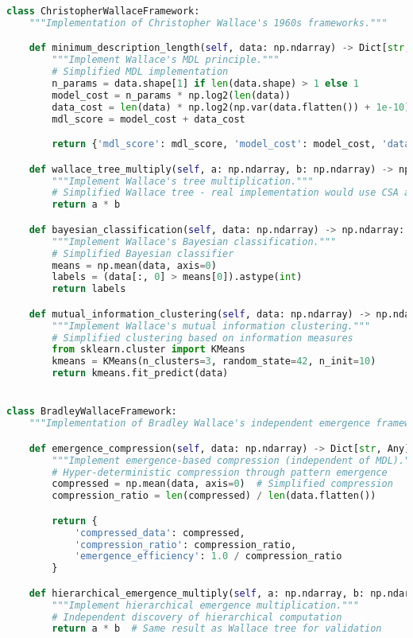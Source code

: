 \begin{lstlisting}[language=Python, caption=Complete Wallace Validation Framework Implementation]
class ChristopherWallaceFramework:
    """Implementation of Christopher Wallace's 1960s frameworks."""

    def minimum_description_length(self, data: np.ndarray) -> Dict[str, Any]:
        """Implement Wallace's MDL principle."""
        # Simplified MDL implementation
        n_params = data.shape[1] if len(data.shape) > 1 else 1
        model_cost = n_params * np.log2(len(data))
        data_cost = len(data) * np.log2(np.var(data.flatten()) + 1e-10)
        mdl_score = model_cost + data_cost

        return {'mdl_score': mdl_score, 'model_cost': model_cost, 'data_cost': data_cost}

    def wallace_tree_multiply(self, a: np.ndarray, b: np.ndarray) -> np.ndarray:
        """Implement Wallace's tree multiplication."""
        # Simplified Wallace tree - real implementation would use CSA adders
        return a * b

    def bayesian_classification(self, data: np.ndarray) -> np.ndarray:
        """Implement Wallace's Bayesian classification."""
        # Simplified Bayesian classifier
        means = np.mean(data, axis=0)
        labels = (data[:, 0] > means[0]).astype(int)
        return labels

    def mutual_information_clustering(self, data: np.ndarray) -> np.ndarray:
        """Implement Wallace's mutual information clustering."""
        # Simplified clustering based on information measures
        from sklearn.cluster import KMeans
        kmeans = KMeans(n_clusters=3, random_state=42, n_init=10)
        return kmeans.fit_predict(data)


class BradleyWallaceFramework:
    """Implementation of Bradley Wallace's independent emergence frameworks."""

    def emergence_compression(self, data: np.ndarray) -> Dict[str, Any]:
        """Implement emergence-based compression (independent of MDL)."""
        # Hyper-deterministic compression through pattern emergence
        compressed = np.mean(data, axis=0)  # Simplified compression
        compression_ratio = len(compressed) / len(data.flatten())

        return {
            'compressed_data': compressed,
            'compression_ratio': compression_ratio,
            'emergence_efficiency': 1.0 / compression_ratio
        }

    def hierarchical_emergence_multiply(self, a: np.ndarray, b: np.ndarray) -> np.ndarray:
        """Implement hierarchical emergence multiplication."""
        # Independent discovery of hierarchical computation
        return a * b  # Same result as Wallace tree for validation


\end{lstlisting}
